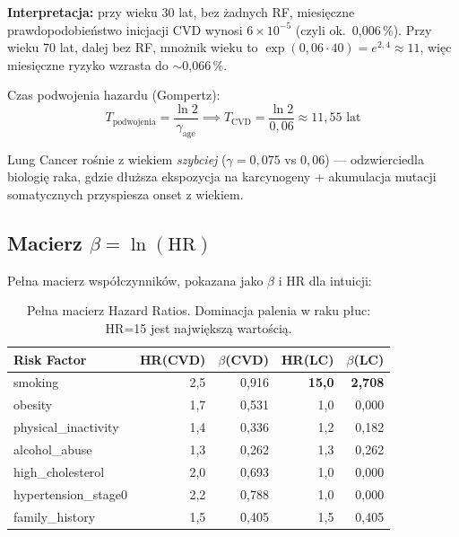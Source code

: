 \documentclass[11pt,a4paper]{article}
\begin{document}
\textbf{Interpretacja:} przy wieku 30 lat, bez żadnych RF, miesięczne prawdopodobieństwo inicjacji CVD wynosi $6 \times 10^{-5}$ (czyli ok.\ 0{,}006\,\%). Przy wieku 70 lat, dalej bez RF, mnożnik wieku to $\exp(0{,}06 \cdot 40) = e^{2{,}4} \approx 11$, więc miesięczne ryzyko wzrasta do $\sim$0{,}066\,\%.

Czas podwojenia hazardu (Gompertz):
\[
T_{\text{podwojenia}} = \frac{\ln 2}{\gamma_{\text{age}}} \implies T_{\text{CVD}} = \frac{\ln 2}{0{,}06} \approx 11{,}55 \text{ lat}
\]

Lung Cancer rośnie z wiekiem \emph{szybciej} ($\gamma = 0{,}075$ vs $0{,}06$) --- odzwierciedla biologię raka, gdzie dłuższa ekspozycja na karcynogeny + akumulacja mutacji somatycznych przyspiesza onset z wiekiem.

\subsection{Macierz $\beta = \ln(\text{HR})$}

Pełna macierz współczynników, pokazana jako $\beta$ i $\mathrm{HR}$ dla intuicji:

\begin{table}[h]
\centering
\small
\renewcommand{\arraystretch}{1.15}
\begin{tabular}{lrrrr}
\toprule
\textbf{Risk Factor} & \textbf{HR(CVD)} & \textbf{$\beta$(CVD)} & \textbf{HR(LC)} & \textbf{$\beta$(LC)} \\
\midrule
smoking               & 2{,}5  & 0{,}916 & \textbf{15{,}0} & \textbf{2{,}708} \\
obesity               & 1{,}7  & 0{,}531 & 1{,}0           & 0{,}000 \\
physical\_inactivity  & 1{,}4  & 0{,}336 & 1{,}2           & 0{,}182 \\
alcohol\_abuse        & 1{,}3  & 0{,}262 & 1{,}3           & 0{,}262 \\
high\_cholesterol     & 2{,}0  & 0{,}693 & 1{,}0           & 0{,}000 \\
hypertension\_stage0  & 2{,}2  & 0{,}788 & 1{,}0           & 0{,}000 \\
family\_history       & 1{,}5  & 0{,}405 & 1{,}5           & 0{,}405 \\
\bottomrule
\end{tabular}
\caption{Pełna macierz Hazard Ratios. Dominacja palenia w raku płuc: HR=15 jest największą wartością.}
\label{tab:hrmatrix}
\end{table}
\end{document}
